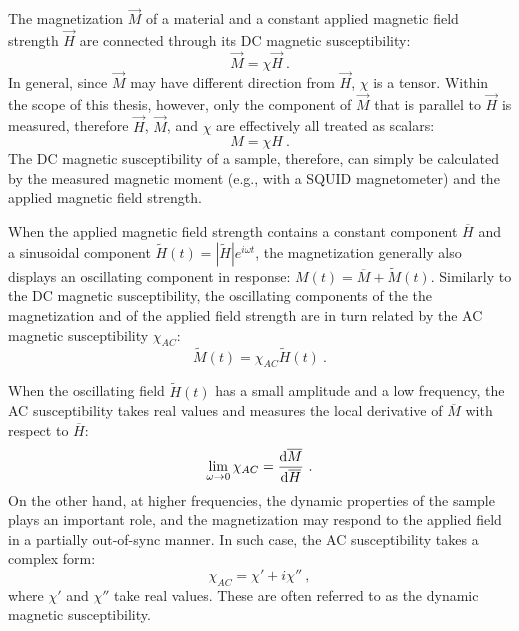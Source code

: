 The magnetization $\vec{M}$ of a material and a constant applied magnetic field strength $\vec{H}$ are connected through its DC magnetic susceptibility:
\begin{equation}%
    \vec{M} = \chi\vec{H}~.%
\end{equation}%
%
In general, since $\vec{M}$ may have different direction from $\vec{H}$, $\chi$ is a tensor. Within the scope of this thesis, however, only the component of $\vec{M}$ that is parallel to $\vec{H}$ is measured, therefore $\vec{H}$, $\vec{M}$, and $\chi$ are effectively all treated as scalars:
\begin{equation}%
    M = \chi{}H~.%
\end{equation}%
%
The DC magnetic susceptibility of a sample, therefore, can simply be calculated by the measured magnetic moment (e.g., with a SQUID magnetometer) and the applied magnetic field strength.

When the applied magnetic field strength contains a constant component $\overline{H}$ and a sinusoidal component $\widetilde{H}(t)=\left|\widetilde{H}\right|e^{i\omega{}t}$, the magnetization generally also displays an oscillating component in response: $M(t) = \overline{M} + \widetilde{M}(t)$. Similarly to the DC magnetic susceptibility, the oscillating components of the the magnetization and of the applied field strength are in turn related by the AC magnetic susceptibility $\chi_{AC}$:
\begin{equation}%
    \widetilde{M}(t) = \chi_{AC}\widetilde{H}(t)~.%
\end{equation}%

When the oscillating field $\widetilde{H}(t)$ has a small amplitude and a low frequency, the AC susceptibility takes real values and measures the local derivative of $\overline{M}$ with respect to $\overline{H}$:%
\begin{equation}%
    \lim\limits_{\omega \to 0}\chi_{AC} = \frac{\diff\overline{M}}{\diff\overline{H}}~.%
\end{equation}%
%
On the other hand, at higher frequencies, the dynamic properties of the sample plays an important role, and the magnetization may respond to the applied field in a partially out-of-sync manner. In such case, the AC susceptibility takes a complex form:%
\begin{equation}%
    \chi_{AC} = \chi' + i\chi''~,%
\end{equation}%
where $\chi'$ and $\chi''$ take real values. These are often referred to as the dynamic magnetic susceptibility.

